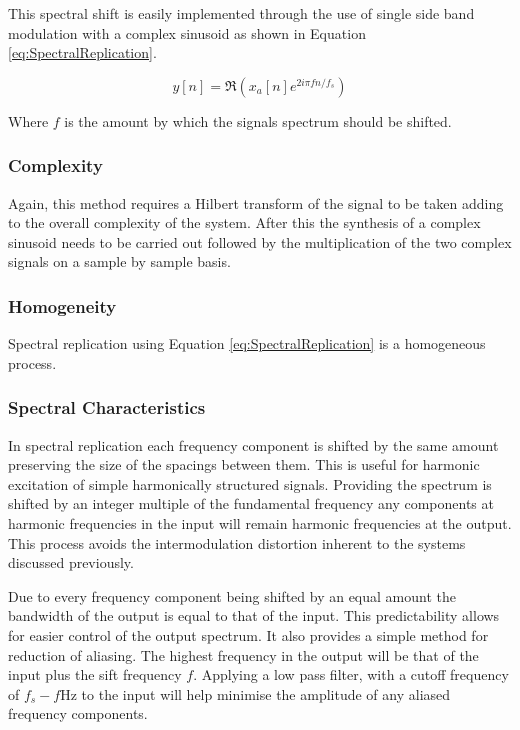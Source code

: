 		This spectral shift is easily implemented through the use of single side band modulation with a complex
		sinusoid as shown in Equation \ref{eq:SpectralReplication}.

		\begin{equation}
			y[n] = \Re \left( x_{a}[n] e^{2i\pi fn/ f_{s}} \right)
			\label{eq:SpectralReplication}
		\end{equation}

		Where $f$ is the amount by which the signals spectrum should be shifted.

		\subsubsection*{Complexity}
			Again, this method requires a Hilbert transform of the signal to be taken adding to the overall
			complexity of the system. After this the synthesis of a complex sinusoid needs to be carried out
			followed by the multiplication of the two complex signals on a sample by sample basis.

		\subsubsection*{Homogeneity}
			Spectral replication using Equation \ref{eq:SpectralReplication} is a homogeneous process.
			
		\subsubsection*{Spectral Characteristics}
			In spectral replication each frequency component is shifted by the same amount preserving the size
			of the spacings between them. This is useful for harmonic excitation of simple harmonically
			structured signals. Providing the spectrum is shifted by an integer multiple of the fundamental
			frequency any components at harmonic frequencies in the input will remain harmonic frequencies at
			the output. This process avoids the intermodulation distortion inherent to the systems discussed
			previously. 

			Due to every frequency component being shifted by an equal amount the bandwidth of the output is
			equal to that of the input. This predictability allows for easier control of the output spectrum.
			It also provides a simple method for reduction of aliasing. The highest frequency in the output
			will be that of the input plus the sift frequency $f$. Applying a low pass filter, with a cutoff
			frequency of $f_{s} - f$Hz to the input will help minimise the amplitude of any aliased frequency
			components.

